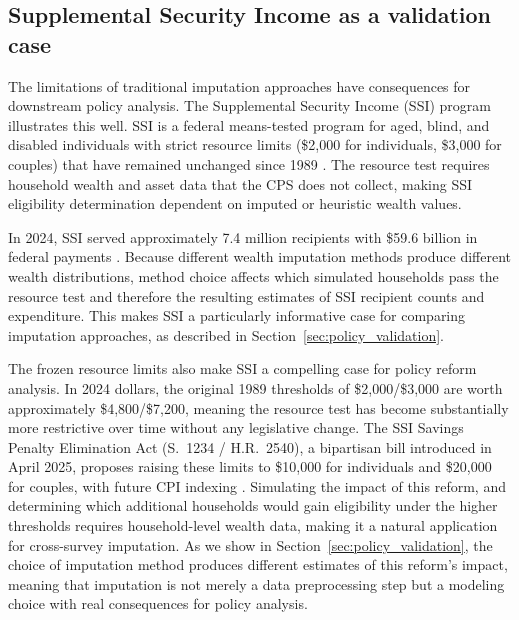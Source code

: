\subsection{Supplemental Security Income as a validation case}

The limitations of traditional imputation approaches have consequences for downstream policy analysis. The Supplemental Security Income (SSI) program illustrates this well. SSI is a federal means-tested program for aged, blind, and disabled individuals with strict resource limits (\$2,000 for individuals, \$3,000 for couples) that have remained unchanged since 1989 \citep{ssa2023ssi}. The resource test requires household wealth and asset data that the CPS does not collect, making SSI eligibility determination dependent on imputed or heuristic wealth values.

In 2024, SSI served approximately 7.4 million recipients with \$59.6 billion in federal payments \citep{ssa2024ssi}. Because different wealth imputation methods produce different wealth distributions, method choice affects which simulated households pass the resource test and therefore the resulting estimates of SSI recipient counts and expenditure. This makes SSI a particularly informative case for comparing imputation approaches, as described in Section~\ref{sec:policy_validation}.

The frozen resource limits also make SSI a compelling case for policy reform analysis. In 2024 dollars, the original 1989 thresholds of \$2,000/\$3,000 are worth approximately \$4,800/\$7,200, meaning the resource test has become substantially more restrictive over time without any legislative change. The SSI Savings Penalty Elimination Act (S.~1234 / H.R.~2540), a bipartisan bill introduced in April 2025, proposes raising these limits to \$10,000 for individuals and \$20,000 for couples, with future CPI indexing \citep{ssi_spea_2025}. Simulating the impact of this reform, and determining which additional households would gain eligibility under the higher thresholds requires household-level wealth data, making it a natural application for cross-survey imputation. As we show in Section~\ref{sec:policy_validation}, the choice of imputation method produces different estimates of this reform's impact, meaning that imputation is not merely a data preprocessing step but a modeling choice with real consequences for policy analysis.
